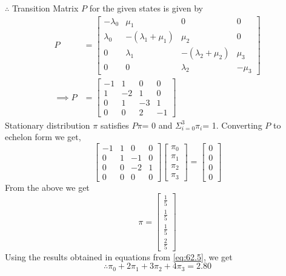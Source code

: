 \documentclass[journal,12pt,twocolumn]{IEEEtran}
\theoremstyle{remark}
\begin{document}
$\therefore$ Transition Matrix $P$ for the given states is given by 
\begin{equation}
\label{eq:62.3}
\begin{split}
P &= \begin{bmatrix}
-\lambda_0 & \mu_1 & 0 & 0 \\
\lambda_0 & -(\lambda_1 + \mu_1) & \mu_2 & 0 \\
0 & \lambda_1 & -(\lambda_2 + \mu_2) & \mu_3\\
0 & 0 & \lambda_2 & -\mu_3
\end{bmatrix}\\
\implies 
P &= \begin{bmatrix}
-1 & 1 & 0 & 0 \\
1 & -2 & 1 & 0 \\
0 & 1 & -3 & 1\\
0 & 0 & 2 & -1
\end{bmatrix}
\end{split}
\end{equation}
Stationary distribution $\pi$ satisfies $P$$\pi$= 0 and $\Sigma_{i=0}^{3}\pi_i$= 1. Converting $P$ to echelon form we get,
\begin{equation}
\label{eq:62.4}
\begin{bmatrix}
-1 & 1 & 0 & 0 \\
0 & 1 & -1 & 0 \\
0 & 0 & -2 & 1\\
0 & 0 & 0 & 0
\end{bmatrix}
\begin{bmatrix}
\pi_0\\
\pi_1\\
\pi_2\\
\pi_3
\end{bmatrix} =
\begin{bmatrix}
0\\
0\\
0\\
0
\end{bmatrix}
\end{equation}
From the above we get
\begin{equation}
\label{eq:62.5}
\pi = \begin{bmatrix}
\frac{1}{5}\\
\frac{1}{5}\\
\frac{1}{5}\\
\frac{2}{5}
\end{bmatrix}
\end{equation}
Using the results obtained in equations from \eqref{eq:62.5}, we get 
\begin{equation}
\therefore \pi_0 + 2\pi_1 + 3\pi_2 + 4\pi_3 = 2.80
\end{equation}
\end{document}
